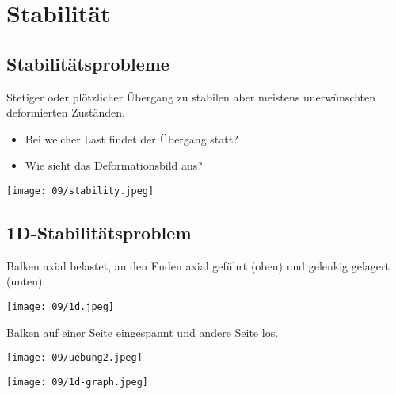 \section{Stabilität}
    \subsection{Stabilitätsprobleme}
        Stetiger oder plötzlicher Übergang zu stabilen aber meistens unerwünschten deformierten Zuständen.\vspace{-1mm}
        \begin{itemize}
            \item Bei welcher Last findet der Übergang statt?
            \item Wie sieht das Deformationsbild aus?
        \end{itemize}
        \begin{center}
            \texttt{[image: 09/stability.jpeg]}
        \end{center}
    \subsection{1D-Stabilitätsproblem}
        Balken axial belastet, an den Enden axial geführt (oben) und gelenkig gelagert (unten).
        \vspace{-2mm}
        \begin{center}
            \texttt{[image: 09/1d.jpeg]}
        \end{center}
        \vspace{-3mm}
        Balken auf einer Seite eingespannt und andere Seite los.
        \begin{center}
            \texttt{[image: 09/uebung2.jpeg]}
        \end{center}
        \texttt{[image: 09/1d-graph.jpeg]}
        
        \begin{comment}
        \subsubsection{Plastifizieren vor Knicken}
            $P_{plast} \leqslant P_k $
        \end{comment}
